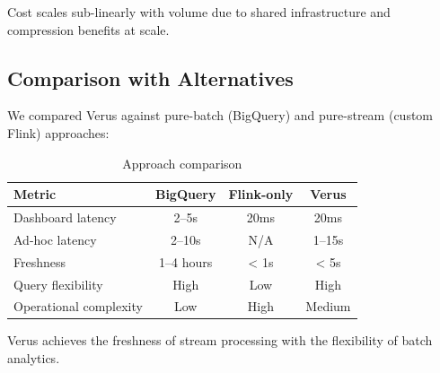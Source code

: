Cost scales sub-linearly with volume due to shared infrastructure and compression benefits at scale.

\subsection{Comparison with Alternatives}

We compared Verus against pure-batch (BigQuery) and pure-stream (custom Flink) approaches:

\begin{table}[h]
\centering
\caption{Approach comparison}
\label{tab:comparison}
\begin{tabular}{lccc}
\hline
Metric & BigQuery & Flink-only & Verus \\
\hline
Dashboard latency & 2--5s & 20ms & 20ms \\
Ad-hoc latency & 2--10s & N/A & 1--15s \\
Freshness & 1--4 hours & < 1s & < 5s \\
Query flexibility & High & Low & High \\
Operational complexity & Low & High & Medium \\
\hline
\end{tabular}
\end{table}

Verus achieves the freshness of stream processing with the flexibility of batch analytics.

